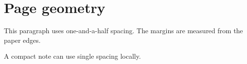 \documentclass{article}
\begin{document}
\section{Page geometry}
This paragraph uses one-and-a-half spacing. The margins are measured from the paper edges.
\begin{singlespace}A compact note can use single spacing locally.\end{singlespace}
\end{document}
